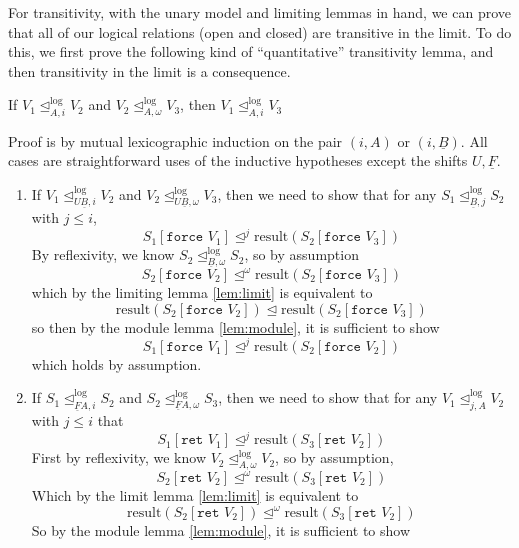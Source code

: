 \documentclass[acmsmall,nonacm]{acmart}
\newif\ifshort
\newif\iflong
\renewcommand{\u}{\underline}
\newcommand{\apreorder}{\trianglelefteq}
\newcommand{\ix}[2]{\mathrel{#1^{#2}}}
\newcommand{\itylrof}[3]{\ilrof{#1}{#3,#2}}
\newcommand{\ilrof}[2]{\mathrel{{#1}^{\text{log}}_{#2}}}
\newcommand{\itylr}[2]{\itylrof{\apreorder}{#1}{#2}}
\newcommand{\result}{\text{result}}
\newcommand{\kw}[1]{\texttt{#1}\,\,}
\newcommand{\ret}{\kw{ret}}
\newcommand{\force}{\kw{force}}
\begin{document}
{For transitivity, with the unary model and limiting lemmas in hand, we
can prove that all of our logical relations (open and closed) are
transitive in the limit. To do this, we first prove the following kind
of ``quantitative'' transitivity lemma, and then transitivity in the
limit is a consequence.
\begin{lemma} \hfill
  
  \iflong
  \begin{enumerate}
  \item
  \fi
    If $V_1 \itylr i A V_2$ and $V_2 \itylr
    \omega A V_3$, then $V_1 \itylr i A V_3$\ifshort, and analogously
    for stacks. \fi
  \iflong
  \item If $S_1 \itylr i {\u B} S_2$ and $S_2 \itylr
    \omega {\u B} S_3$, then $S_1 \itylr i {\u B} S_3$
  \end{enumerate}
    \fi
\end{lemma}
\begin{longproof}
  Proof is by mutual lexicographic induction on the pair $(i, A)$ or
  $(i, \u B)$. All cases are straightforward uses of the inductive
  hypotheses except the shifts $U, \u F$.
  \begin{enumerate}
  \item If $V_1 \itylr i {U \u B} V_2$ and $V_2
    \itylr \omega {U \u B} V_3$, then we need to show that
    for any $S_1 \itylr j {\u B} S_2$ with $j \leq i$,
    \[ S_1[\force V_1] \ix\apreorder j \result(S_2[\force V_3]) \]
    By reflexivity, we know $S_2 \itylr \omega {\u B} S_2$, so by assumption
    \[ S_2[\force V_2] \ix\apreorder \omega \result(S_2[\force V_3])\]
    which by the limiting lemma \ref{lem:limit} is equivalent to
    \[ \result(S_2[\force V_2]) \apreorder \result(S_2[\force V_3]) \]
    so then by the module lemma \ref{lem:module}, it is sufficient to show
    \[ S_1[\force V_1] \ix\apreorder j \result(S_2[\force V_2]) \]
    which holds by assumption.
  \item If $S_1 \itylr i {\u F A} S_2$ and $S_2 \itylr \omega {\u F A}
    S_3$, then we need to show that for any $V_1 \itylr A j V_2$ with $j \leq i$ that
    \[ S_1[\ret V_1] \ix\apreorder j \result(S_3[\ret V_2])\]
    First by reflexivity, we know $V_2 \itylr \omega A V_2$, so by assumption,
    \[ S_2[\ret V_2] \ix\apreorder \omega \result(S_3[\ret V_2]) \]
    Which by the limit lemma \ref{lem:limit} is equivalent to
    \[ \result(S_2[\ret V_2]) \ix\apreorder \omega \result(S_3[\ret V_2]) \]
    So by the module lemma \ref{lem:module}, it is sufficient to show

\end{enumerate}
\end{longproof}}
\end{document}
